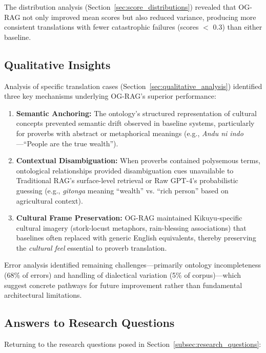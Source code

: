 The distribution analysis (Section~\ref{sec:score_distributions}) revealed that OG-RAG not only improved mean scores but also reduced variance, producing more consistent translations with fewer catastrophic failures (scores $<$ 0.3) than either baseline.

\subsection{Qualitative Insights}
\label{subsec:qual_summary}

Analysis of specific translation cases (Section~\ref{sec:qualitative_analysis}) identified three key mechanisms underlying OG-RAG's superior performance:

\begin{enumerate}
    \item \textbf{Semantic Anchoring:} The ontology's structured representation of cultural concepts prevented semantic drift observed in baseline systems, particularly for proverbs with abstract or metaphorical meanings (e.g., \emph{Andu ni indo}—``People are the true wealth'').
    
    \item \textbf{Contextual Disambiguation:} When proverbs contained polysemous terms, ontological relationships provided disambiguation cues unavailable to Traditional RAG's surface-level retrieval or Raw GPT-4's probabilistic guessing (e.g., \emph{gitonga} meaning ``wealth'' vs. ``rich person'' based on agricultural context).
    
    \item \textbf{Cultural Frame Preservation:} OG-RAG maintained Kikuyu-specific cultural imagery (stork-locust metaphors, rain-blessing associations) that baselines often replaced with generic English equivalents, thereby preserving the \emph{cultural feel} essential to proverb translation.
\end{enumerate}

Error analysis identified remaining challenges—primarily ontology incompleteness (68\% of errors) and handling of dialectical variation (5\% of corpus)—which suggest concrete pathways for future improvement rather than fundamental architectural limitations.

\subsection{Answers to Research Questions}
\label{subsec:rq_answers}

Returning to the research questions posed in Section~\ref{subsec:research_questions}:

